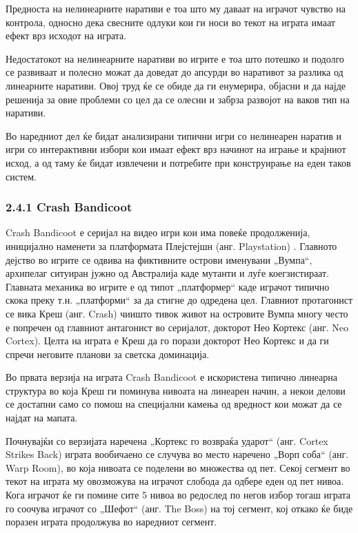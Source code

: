 Предноста на нелинеарните наративи е тоа што му даваат на играчот чувство на контрола, односно дека свесните одлуки кои ги носи во текот на играта имаат ефект врз исходот на играта.

Недостатокот на нелинеарните наративи во игрите е тоа што потешко и подолго се развиваат и полесно можат да доведат до апсурди во наративот за разлика од линеарните наративи. Овој труд ќе се обиде да ги енумерира, објасни и да најде решенија за овие проблеми со цел да се олесни и забрза развојот на ваков тип на наративи.

Во наредниот дел ќе бидат анализирани типични игри со нелинеарен наратив и игри со интерактивни избори кои имаат ефект врз начинот на играње и крајниот исход, а од таму ќе бидат извлечени и потребите при конструирање на еден таков систем.

\subsubsection{2.4.1 Crash Bandicoot}

Crash Bandicoot е серијал на видео игри кои има повеќе продолженија, иницијално наменети за платформата Плејстејшн (анг. Playstation) \cite{ref16}. Главното дејство во игрите се одвива на фиктивните острови именувани „Вумпа“, архипелаг ситуиран јужно од Австралија каде мутанти и луѓе коегзистираат. Главната механика во игрите е од типот „платформер“ каде играчот типично скока преку т.н. „платформи“ за да стигне до одредена цел. Главниот протагонист се вика Креш (анг. Crash) чиишто тивок живот на островите Вумпа многу често е попречен од главниот антагонист во серијалот, докторот Нео Кортекс (анг. Neo Cortex). Целта на играта е Креш да го порази докторот Нео Кортекс и да ги спречи неговите планови за светска доминација.

Во првата верзија на играта Crash Bandicoot е искористена типично линеарна структура во која Креш ги поминува нивоата на линеарен начин, а некои делови се достапни само со помош на специјални камења од вредност кои можат да се најдат на мапата.

Почнувајќи со верзијата наречена „Кортекс го возвраќа ударот“ (анг. Cortex Strikes Back) играта вообичаено се случува во место наречено „Ворп соба“ (анг. Warp Room), во која нивоата се поделени во множества од пет. Секој сегмент во текот на играта му овозможува на играчот слобода да одбере еден од пет нивоа. Кога играчот ќе ги помине сите 5 нивоа во редослед по негов избор тогаш играта го соочува играчот со „Шефот“ (анг. The Boss) на тој сегмент, кој откако ќе биде поразен играта продолжува во наредниот сегмент.

